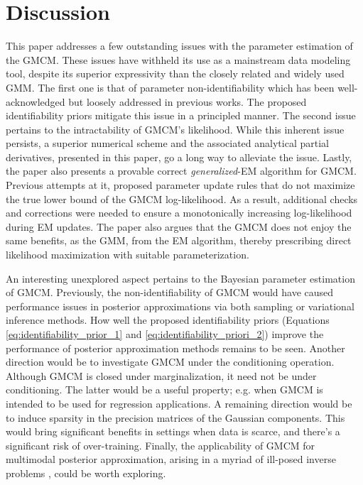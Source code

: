 \documentclass{article}
\theoremstyle{plain}
\theoremstyle{definition}
\theoremstyle{remark}
\begin{document}
\section{Discussion}\label{sec:Discussion}
This paper addresses a few outstanding issues with the parameter estimation of the GMCM. These issues have withheld its use as a mainstream data modeling tool, despite its superior expressivity than the closely related and widely used GMM. The first one is that of parameter non-identifiability which has been well-acknowledged but loosely addressed in previous works. The proposed identifiability priors mitigate this issue in a principled manner. The second issue pertains to the intractability of GMCM's likelihood. While this inherent issue persists, a superior numerical scheme and the associated analytical partial derivatives, presented in this paper, go a long way to alleviate the issue. Lastly, the paper also presents a provable correct \emph{generalized}-EM algorithm for GMCM. Previous attempts at it, proposed parameter update rules that do not maximize the true lower bound of the GMCM log-likelihood. As a result, additional checks and corrections were needed to ensure a monotonically increasing log-likelihood during EM updates. The paper also argues that the GMCM does not enjoy the same benefits, as the GMM, from the EM algorithm, thereby prescribing direct likelihood maximization with suitable parameterization.   

An interesting unexplored aspect pertains to the Bayesian parameter estimation of GMCM. Previously, the non-identifiability of GMCM would have caused performance issues in posterior approximations via both sampling or variational inference methods. How well the proposed identifiability priors (Equations \eqref{eq:identifiability_prior_1} and \eqref{eq:identifiability_priori_2}) improve the performance of posterior approximation methods remains to be seen. Another direction would be to investigate GMCM under the conditioning operation. Although GMCM is closed under marginalization, it need not be under conditioning. The latter would be a useful property; e.g. when GMCM is intended to be used for regression applications.  A remaining direction would be to induce sparsity in the precision matrices of the Gaussian components. This would bring significant benefits in settings when data is scarce, and there's a significant risk of over-training. Finally, the applicability of GMCM for multimodal posterior approximation, arising in a myriad of ill-posed inverse problems \citep{Franck2015,Tewari2022SEG,Zhang2021,Tewari2022SafetyScience}, could be worth exploring. 
\end{document}
